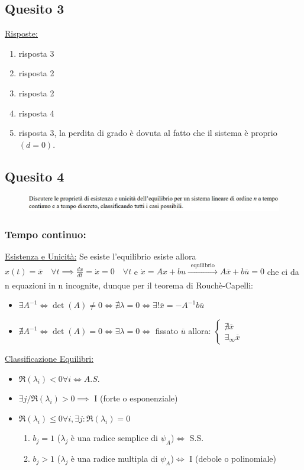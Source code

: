 \documentclass[a4paper]{report}
\begin{document}
\subsection*{Quesito 3}
\underline{Risposte:}
\begin{enumerate}[label= Domanda \arabic*)]
\item risposta 3
\item risposta 2
\item risposta 2
\item risposta 4
\item risposta 3, la perdita di grado è dovuta al fatto  che il sistema è proprio $(d=0)$.
\end{enumerate}
\subsection*{Quesito 4}
\begin{figure}[h]
\includegraphics[width=\textwidth]{quarta_domanda}
\end{figure}
\subsubsection{Tempo continuo:}
\underline{Esistenza e Unicità:}\newline
\bigskip
Se esiste l'equilibrio esiste allora $x(t)=\overline{x}\quad\forall t\implies\frac{dx}{dt}=\dot{x}=0\quad\forall t$ e $\dot{x}=Ax+bu\xrightarrow[]{\,\text{ equilibrio }\,}A\overline{x}+b\overline{u}=0$ che ci da n equazioni in n incognite, dunque per il teorema di Rouchè-Capelli:
\begin{itemize}
\item $\exists A^{-1} \iff \det(A)\neq0 \iff \nexists \lambda=0\iff \exists! \overline{x}=-A^{-1}b\overline{u}$
\item $\nexists A^{-1} \iff \det(A)=0 \iff \exists \lambda=0\iff$ fissato $\overline{u}$ allora: $\left\{\begin{array}{l}
\nexists \overline{x}\\
\exists_\infty \overline{x}
\end{array}\right.$
\end{itemize}
\underline{Classificazione Equilibri:}
\begin{itemize}
\item $\Re(\lambda_i)<0 \forall i\iff A.S.$
\item $\exists j/\Re(\lambda_i)>0\implies$ I (forte o esponenziale)
\item $\Re(\lambda_i)\leq 0 \forall i, \exists j:\Re(\lambda_i)=0$ \begin{enumerate}
\item $b_j=1$ ($\lambda_j$ è una radice semplice di $\psi_A$)$\iff$ S.S.
\item $b_j>1$ ($\lambda_j$ è una radice multipla di $\psi_A$)$\iff$ I (debole o polinomiale)
\end{enumerate}
\end{itemize}
\end{document}
